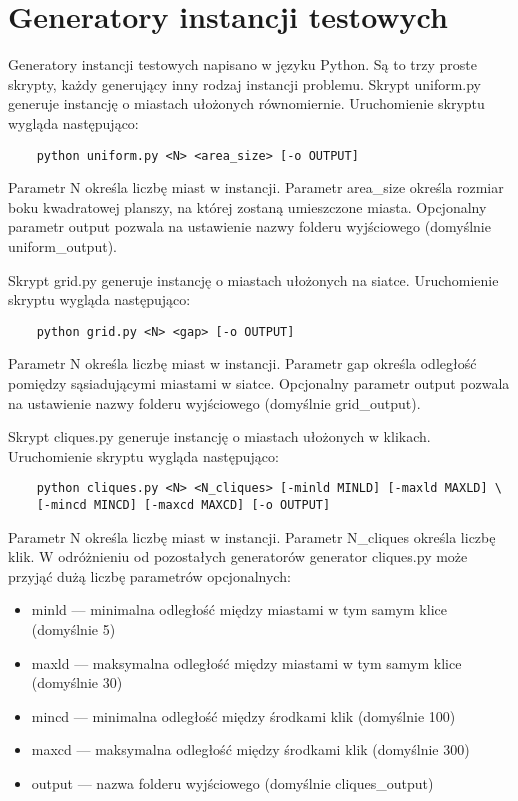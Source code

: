 \section{Generatory instancji testowych}

Generatory instancji testowych napisano w języku Python.
Są to trzy proste skrypty, każdy generujący inny rodzaj instancji problemu.
Skrypt uniform.py generuje instancję o miastach ułożonych równomiernie.
Uruchomienie skryptu wygląda następująco:
\begin{lstlisting}
    python uniform.py <N> <area_size> [-o OUTPUT]
\end{lstlisting}
Parametr N określa liczbę miast w instancji. Parametr area\_size określa rozmiar boku kwadratowej planszy, na której zostaną umieszczone miasta.
Opcjonalny parametr output pozwala na ustawienie nazwy folderu wyjściowego (domyślnie uniform\_output).

Skrypt grid.py generuje instancję o miastach ułożonych na siatce.
Uruchomienie skryptu wygląda następująco:
\begin{lstlisting}
    python grid.py <N> <gap> [-o OUTPUT]
\end{lstlisting}
Parametr N określa liczbę miast w instancji. Parametr gap określa odległość pomiędzy sąsiadującymi miastami w siatce.
Opcjonalny parametr output pozwala na ustawienie nazwy folderu wyjściowego (domyślnie grid\_output).

Skrypt cliques.py generuje instancję o miastach ułożonych w klikach.
Uruchomienie skryptu wygląda następująco:
\begin{lstlisting}
    python cliques.py <N> <N_cliques> [-minld MINLD] [-maxld MAXLD] \ 
    [-mincd MINCD] [-maxcd MAXCD] [-o OUTPUT]
\end{lstlisting}
Parametr N określa liczbę miast w instancji. Parametr N\_cliques określa liczbę klik.
W odróżnieniu od pozostałych generatorów generator cliques.py może przyjąć dużą liczbę parametrów opcjonalnych:
\begin{itemize}
    \item minld --- minimalna odległość między miastami w tym samym klice (domyślnie 5)
    \item maxld --- maksymalna odległość między miastami w tym samym klice (domyślnie 30)
    \item mincd --- minimalna odległość między środkami klik (domyślnie 100)
    \item maxcd --- maksymalna odległość między środkami klik (domyślnie 300)
    \item output --- nazwa folderu wyjściowego (domyślnie cliques\_output)
\end{itemize}


